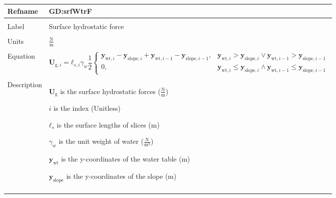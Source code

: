 \documentclass[12pt]{article}
\begin{document}
\noindent \begin{minipage}{\textwidth}
\begin{tabular}{>{\raggedright}p{}>{\raggedright\arraybackslash}p{}}
\toprule \textbf{Refname} & \textbf{GD:srfWtrF}
\label{GD:srfWtrF}
\\ \midrule \\
Label & Surface hydrostatic force
\\ \midrule \\
Units & $\frac{\text{N}}{\text{m}}$
\\ \midrule \\
Equation & \begin{displaymath}
           {\mathbf{U}_{\text{g},i}}={\mathbf{ℓ}_{s,i}} {γ_{w}} \frac{1}{2} \begin{cases}
                                                                            {\mathbf{y}_{\text{wt},i}}-{\mathbf{y}_{\text{slope},i}}+{\mathbf{y}_{\text{wt},i-1}}-{\mathbf{y}_{\text{slope},i-1}}, & {\mathbf{y}_{\text{wt},i}}>{\mathbf{y}_{\text{slope},i}}\lor{}{\mathbf{y}_{\text{wt},i-1}}>{\mathbf{y}_{\text{slope},i-1}}\\
0, & {\mathbf{y}_{\text{wt},i}}\leq{}{\mathbf{y}_{\text{slope},i}}\land{}{\mathbf{y}_{\text{wt},i-1}}\leq{}{\mathbf{y}_{\text{slope},i-1}}
                                                                            \end{cases}
           \end{displaymath}
\\ \midrule \\
Description & \begin{symbDescription}
              \item{${\mathbf{U}_{\text{g}}}$ is the surface hydrostatic forces ($\frac{\text{N}}{\text{m}}$)}
              \item{$i$ is the index (Unitless)}
              \item{${\mathbf{ℓ}_{s}}$ is the surface lengths of slices (m)}
              \item{${γ_{w}}$ is the unit weight of water ($\frac{\text{N}}{\text{m}^{3}}$)}
              \item{${\mathbf{y}_{\text{wt}}}$ is the y-coordinates of the water table (m)}
              \item{${\mathbf{y}_{\text{slope}}}$ is the y-coordinates of the slope (m)}
              \end{symbDescription}
\\ \midrule \\

\end{tabular}
\end{minipage}
\end{document}
